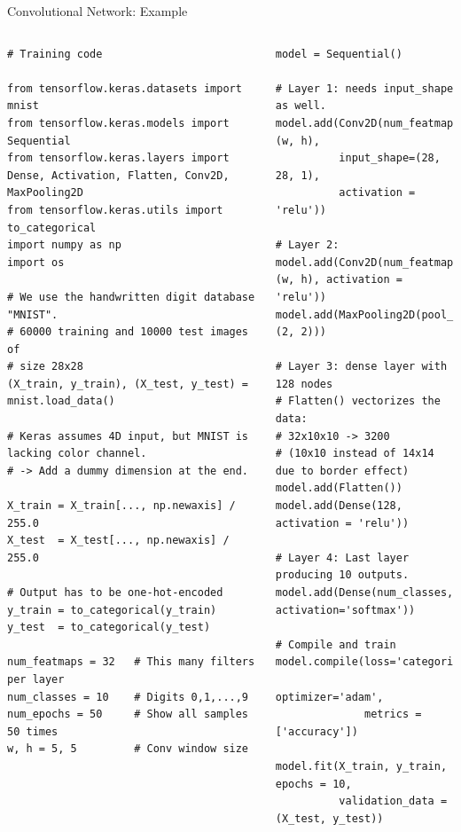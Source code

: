 \documentclass[10pt, aspectratio=169]{beamer} %
\begin{document}
\begin{frame}[fragile]{Convolutional Network: Example}
\begin{columns}
\begin{lstlisting}
# Training code

from tensorflow.keras.datasets import mnist
from tensorflow.keras.models import Sequential
from tensorflow.keras.layers import Dense, Activation, Flatten, Conv2D, MaxPooling2D
from tensorflow.keras.utils import to_categorical
import numpy as np
import os

# We use the handwritten digit database "MNIST".
# 60000 training and 10000 test images of
# size 28x28
(X_train, y_train), (X_test, y_test) = mnist.load_data()

# Keras assumes 4D input, but MNIST is lacking color channel.
# -> Add a dummy dimension at the end.

X_train = X_train[..., np.newaxis] / 255.0
X_test  = X_test[..., np.newaxis] / 255.0

# Output has to be one-hot-encoded
y_train = to_categorical(y_train)
y_test  = to_categorical(y_test)

num_featmaps = 32   # This many filters per layer
num_classes = 10    # Digits 0,1,...,9
num_epochs = 50     # Show all samples 50 times
w, h = 5, 5         # Conv window size
\end{lstlisting}

\begin{lstlisting}
model = Sequential()

# Layer 1: needs input_shape as well.
model.add(Conv2D(num_featmaps, (w, h),
          input_shape=(28, 28, 1),
          activation = 'relu'))

# Layer 2:
model.add(Conv2D(num_featmaps, (w, h), activation = 'relu'))
model.add(MaxPooling2D(pool_size=(2, 2)))

# Layer 3: dense layer with 128 nodes
# Flatten() vectorizes the data:
# 32x10x10 -> 3200
# (10x10 instead of 14x14 due to border effect)
model.add(Flatten())
model.add(Dense(128, activation = 'relu'))

# Layer 4: Last layer producing 10 outputs.
model.add(Dense(num_classes, activation='softmax'))

# Compile and train
model.compile(loss='categorical_crossentropy',
              optimizer='adam',
              metrics = ['accuracy'])

model.fit(X_train, y_train, epochs = 10,
          validation_data = (X_test, y_test))
\end{lstlisting}
\end{columns}
\end{frame}
\end{document}
